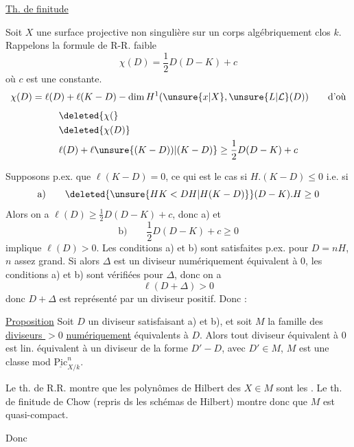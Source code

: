 \uline{Th. de finitude}


Soit $X$ une surface projective non singulière sur un corps algébriquement clos $k$.  Rappelons la formule de R-R. faible
\[
\chi(D)=\frac12D(D-K)+c
\]
où $c$ est une constante.  
\[
\chi(D)=\ell(D)+\ell(K-D)-\dim H^1(\unsure{x|X},\unsure{L|\mathcal{L}}(D))\qquad\text{d'où}
\]
\[
\begin{aligned}
&\deleted{\chi(}\\
&\deleted{\chi(D)}\\
&\ell(D)+\ell\unsure{(K-D))|(K-D)}\geq\frac12D(D-K)+c
\end{aligned}
\]


Supposons p.ex. que $\ell(K-D)=0$, ce qui est le cas si $H.(K-D)\leq0$ i.e. si
\[
\text{a)}\qquad \deleted{\unsure{HK<DH|H(K-D)}} (D-K).H\geq0
\]
Alors on a $\ell(D)\geq\frac12D(D-K)+c$, donc a) et 
\[
\text{b)}\qquad \frac12D(D-K)+c\geq0
\]
implique $\ell(D)>0$. Les conditions a) et b) sont satisfaites p.ex. pour  $D=nH$, $n$ assez grand. Si alors $\Delta$  est un diviseur numériquement équivalent à $0$, les conditions a) et b) sont vérifiées pour $\Delta$, donc on a
\[
\ell(D+\Delta)>0
\]
donc $D+\Delta$ est représenté par un diviseur positif. Donc :

\uline{Proposition} Soit $D$ un diviseur satisfaisant a) et b), et soit $M$ la famille des \uline{diviseurs $>0$} \uline{numériquement} équivalents à $D$. Alors tout diviseur  équivalent à $0$ est lin. équivalent à un diviseur de la forme $D'-D$, avec $D'\in M$,   $M$ est une classe mod $\underline{\mathrm{Pic}}^n_{X/k}$.

Le th. de  R.R.  montre que les polynômes de Hilbert des $X\in M$ sont les . Le th. de finitude de Chow (repris ds les schémas de Hilbert) montre donc que $M$ est quasi-compact.

Donc

